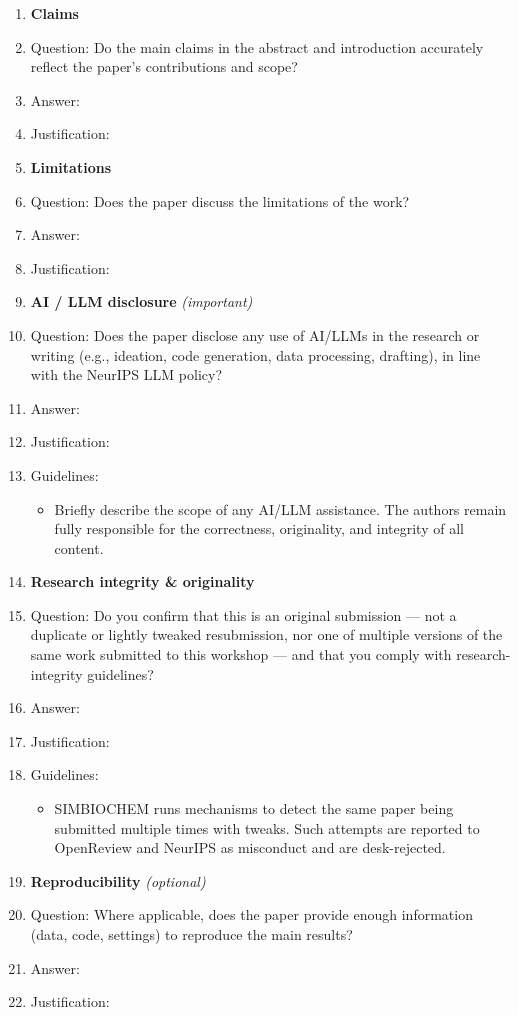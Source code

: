 \begin{enumerate}

\item {\bf Claims}
    \item[] Question: Do the main claims in the abstract and introduction accurately reflect the paper's contributions and scope?
    \item[] Answer: \answerTODO{} %
    \item[] Justification: \justificationTODO{}

\item {\bf Limitations}
    \item[] Question: Does the paper discuss the limitations of the work?
    \item[] Answer: \answerTODO{}
    \item[] Justification: \justificationTODO{}

\item {\bf AI / LLM disclosure} \emph{(important)}
    \item[] Question: Does the paper disclose any use of AI/LLMs in the research or writing (e.g., ideation, code generation, data processing, drafting), in line with the NeurIPS LLM policy?
    \item[] Answer: \answerTODO{}
    \item[] Justification: \justificationTODO{}
    \item[] Guidelines:
    \begin{itemize}
        \item Briefly describe the scope of any AI/LLM assistance. The authors remain fully responsible for the correctness, originality, and integrity of all content.
    \end{itemize}

\item {\bf Research integrity \& originality}
    \item[] Question: Do you confirm that this is an original submission --- not a duplicate or lightly tweaked resubmission, nor one of multiple versions of the same work submitted to this workshop --- and that you comply with research-integrity guidelines?
    \item[] Answer: \answerTODO{}
    \item[] Justification: \justificationTODO{}
    \item[] Guidelines:
    \begin{itemize}
        \item SIMBIOCHEM runs mechanisms to detect the same paper being submitted multiple times with tweaks. Such attempts are reported to OpenReview and NeurIPS as misconduct and are desk-rejected.
    \end{itemize}

\item {\bf Reproducibility} \emph{(optional)}
    \item[] Question: Where applicable, does the paper provide enough information (data, code, settings) to reproduce the main results?
    \item[] Answer: \answerTODO{}
    \item[] Justification: \justificationTODO{}

\end{enumerate}
